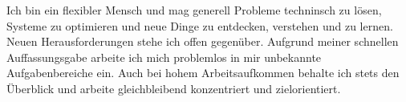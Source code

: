 		Ich bin ein flexibler Mensch und mag generell Probleme techninsch zu lösen, Systeme zu optimieren und neue Dinge zu entdecken, verstehen und zu lernen.
		Neuen Herausforderungen stehe ich offen gegenüber.
		Aufgrund meiner schnellen Auffassungsgabe arbeite ich mich problemlos in mir unbekannte Aufgabenbereiche ein.
		Auch bei hohem Arbeitsaufkommen behalte ich stets den Überblick und arbeite gleichbleibend konzentriert und zielorientiert.